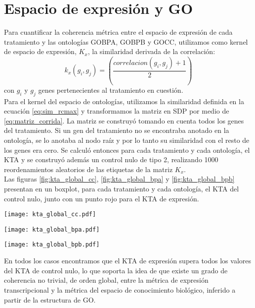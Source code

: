 \section{Espacio de expresión y GO}
Para cuantificar la coherencia métrica entre el espacio de expresión de cada tratamiento y las ontologías GOBPA, GOBPB y GOCC, utilizamos como kernel de espacio de expresión, $K_x$, la similaridad derivada de la correlación:
\begin{equation}
	k_x(g_i, g_j) = (\frac{correlacion(g_i, g_j)+1}{2})
	\label{eq:similaridad_de_correlacion}
\end{equation}
con $g_i$ y $g_j$ genes pertenecientes al tratamiento en cuestión.\\
Para el kernel del espacio de ontologías, utilizamos la similaridad definida en la ecuación \ref{eq:sim_rcmax} y transformamos la matriz en SDP por medio de \ref{eq:matriz_corrida}. La matriz se construyó tomando en cuenta todos los genes del tratamiento. Si un gen del tratamiento no se encontraba anotado en la ontología, se lo anotaba al nodo raíz y por lo tanto su similaridad con el resto de los genes era cero. Se calculó entonces para cada tratamiento y cada ontología, el KTA y se construyó además un control nulo de tipo 2, realizando 1000 reordenamientos aleatorios de las etiquetas de la matriz $K_x$.\\
Las figuras \ref{fig:kta_global_cc}, \ref{fig:kta_global_bpa} y \ref{fig:kta_global_bpb} presentan en un boxplot, para cada tratamiento y cada ontología, el KTA del control nulo, junto con un punto rojo para el KTA de expresión. 
\begin{center}
\texttt{[image: kta\_global\_cc.pdf]}
\label{fig:kta_global_cc}
\end{center}
\begin{center}
\texttt{[image: kta\_global\_bpa.pdf]}
\label{fig:kta_global_bpa}
\end{center}
\begin{center}
\texttt{[image: kta\_global\_bpb.pdf]}
\label{fig:kta_global_bpb}
\end{center}
En todos los casos encontramos que el KTA de expresión supera todos los valores del KTA de control nulo, lo que soporta la idea de que existe un grado de coherencia no trivial, de orden global, entre la métrica de expresión transcripcional y la métrica del espacio de conocimiento biológico, inferido a partir de la estructura de GO.
